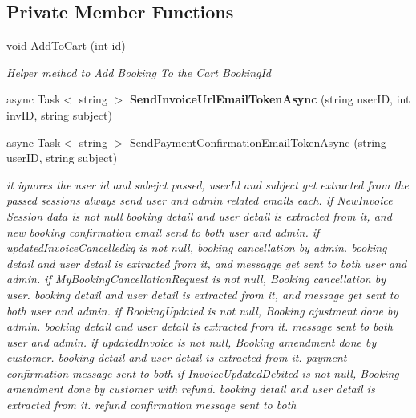 \subsection*{Private Member Functions}
\begin{DoxyCompactItemize}
\item 
void \hyperlink{class_alfa_accounting_1_1_controllers_1_1_booking_view_models_controller_a741b6cc23c814a19db514ad186687986}{Add\+To\+Cart} (int id)
\begin{DoxyCompactList}\small\item\em Helper method to Add Booking To the Cart Booking\+Id \end{DoxyCompactList}\item 
\mbox{\label{class_alfa_accounting_1_1_controllers_1_1_booking_view_models_controller_a9a319bacf4cd2b5512566864c1cc6353}} 
async Task$<$ string $>$ {\bfseries Send\+Invoice\+Url\+Email\+Token\+Async} (string user\+ID, int inv\+ID, string subject)
\item 
async Task$<$ string $>$ \hyperlink{class_alfa_accounting_1_1_controllers_1_1_booking_view_models_controller_afba945bda68b35457708ec76ba5ae3b9}{Send\+Payment\+Confirmation\+Email\+Token\+Async} (string user\+ID, string subject)
\begin{DoxyCompactList}\small\item\em it ignores the user id and subejct passed, user\+Id and subject get extracted from the passed sessions always send user and admin related emails each. if New\+Invoice Session data is not null booking detail and user detail is extracted from it, and new booking confirmation email send to both user and admin. if updated\+Invoice\+Cancelledkg is not null, booking cancellation by admin. booking detail and user detail is extracted from it, and messagge get sent to both user and admin. if My\+Booking\+Cancellation\+Request is not null, Booking cancellation by user. booking detail and user detail is extracted from it, and message get sent to both user and admin. if Booking\+Updated is not null, Booking ajustment done by admin. booking detail and user detail is extracted from it. message sent to both user and admin. if updated\+Invoice is not null, Booking amendment done by customer. booking detail and user detail is extracted from it. payment confirmation message sent to both if Invoice\+Updated\+Debited is not null, Booking amendment done by customer with refund. booking detail and user detail is extracted from it. refund confirmation message sent to both \end{DoxyCompactList}\end{DoxyCompactItemize}
